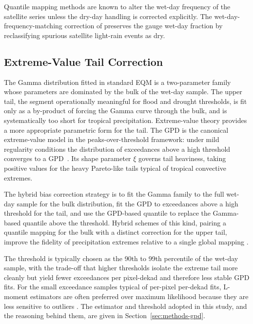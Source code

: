 Quantile mapping methods are known to alter the wet-day
frequency of the satellite series unless the dry-day handling
is corrected explicitly. The wet-day-frequency-matching
correction of \citet{ref:cannon2015} preserves the gauge wet-day
fraction by reclassifying spurious satellite light-rain events
as dry.

\subsection{Extreme-Value Tail Correction}\label{sec:lit-gpd}

The Gamma distribution fitted in standard EQM is a
two-parameter family whose parameters are dominated by the
bulk of the wet-day sample. The upper tail, the segment
operationally meaningful for flood and drought thresholds, is
fit only as a by-product of forcing the Gamma curve through
the bulk, and is systematically too short for tropical
precipitation. Extreme-value theory provides a more appropriate
parametric form for the tail. The GPD is the canonical extreme-value model in the
peaks-over-threshold framework: under mild regularity
conditions the distribution of exceedances above a high
threshold converges to a GPD~\citep{ref:pickands1975, ref:coles2001}.
Its shape parameter $\xi$ governs tail heaviness, taking positive
values for the heavy Pareto-like tails typical of tropical
convective extremes.

The hybrid bias correction strategy is to fit the Gamma family
to the full wet-day sample for the bulk distribution, fit the
GPD to exceedances above a high threshold for the tail, and use
the GPD-based quantile to replace the Gamma-based quantile
above the threshold. Hybrid schemes of this kind, pairing a
quantile mapping for the bulk with a distinct correction for the
upper tail, improve the fidelity of precipitation extremes
relative to a single global mapping \citep{ref:holthuijzen2022}.

The threshold is typically chosen as the
90th to 99th percentile of the wet-day sample, with the trade-off
that higher thresholds isolate the extreme tail more cleanly
but yield fewer exceedances per pixel-dekad and therefore less
stable GPD fits. For the small exceedance samples typical of per-pixel per-dekad
fits, L-moment estimators are often preferred over maximum
likelihood because they are less sensitive to outliers
\citep{ref:hoskingwallis1997}. The estimator and threshold
adopted in this study, and the reasoning behind them, are given in
Section~\ref{sec:methods-gpd}.

